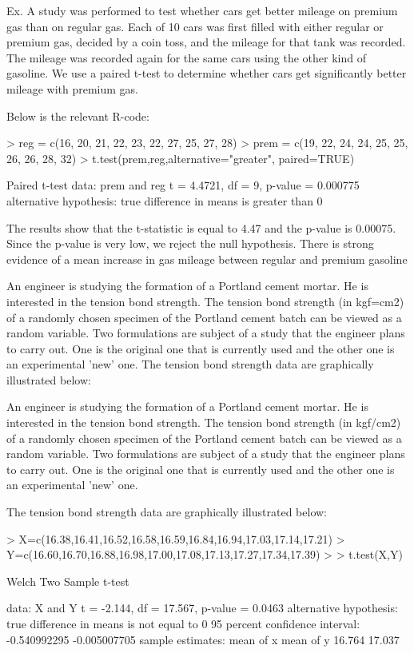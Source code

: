 Ex. A study was performed to test whether cars get better mileage on premium gas than on regular gas. Each of 10 cars was first filled with either regular or premium gas, decided by a coin toss, and the mileage for that tank was recorded. The mileage was recorded again for the same cars using the other kind of gasoline. We use a paired t-test to determine whether cars get significantly better mileage with premium gas.

Below is the relevant R-code:


> reg = c(16, 20, 21, 22, 23, 22, 27, 25, 27, 28)
> prem = c(19, 22, 24, 24, 25, 25, 26, 26, 28, 32)
> t.test(prem,reg,alternative="greater", paired=TRUE)


Paired t-test
data: prem and reg
t = 4.4721, df = 9, p-value = 0.000775
alternative hypothesis: true difference in means is greater than 0



The results show that the t-statistic is equal to 4.47 and the p-value is 0.00075. Since the p-value is very low, we reject the null hypothesis. There is strong evidence of a mean increase in gas mileage between regular and premium gasoline





An engineer is studying the formation of a Portland cement mortar. He is interested
in the tension bond strength. The tension bond strength (in kgf=cm2) of a randomly chosen specimen
of the Portland cement batch can be viewed as a random variable. Two formulations are subject of
a study that the engineer plans to carry out. One is the original one that is currently used and the
other one is an experimental 'new' one. The tension bond strength data are graphically illustrated
below:


An engineer is studying the formation of a Portland cement mortar. He is interested
in the tension bond strength. The tension bond strength (in kgf/cm2) of a randomly chosen specimen of the Portland cement batch can be viewed as a random variable. Two formulations are subject of a study that the engineer plans to carry out. One is the original one that is currently used and the other one is an experimental 'new' one. 

The tension bond strength data are graphically illustrated below:


> X=c(16.38,16.41,16.52,16.58,16.59,16.84,16.94,17.03,17.14,17.21)
> Y=c(16.60,16.70,16.88,16.98,17.00,17.08,17.13,17.27,17.34,17.39)
> 
> t.test(X,Y)

        Welch Two Sample t-test

data:  X and Y 
t = -2.144, df = 17.567, p-value = 0.0463
alternative hypothesis: true difference in means is not equal to 0 
95 percent confidence interval:
 -0.540992295 -0.005007705 
sample estimates:
mean of x mean of y 
   16.764    17.037 


